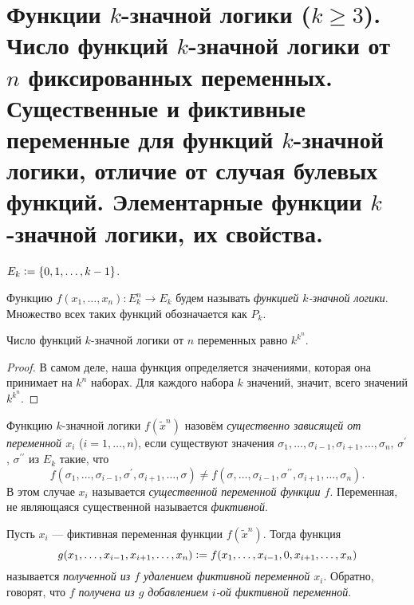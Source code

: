 \section{Функции $k$-значной логики ($k \geqslant 3$). Число функций $k$-значной логики от $n$ фиксированных переменных. Существенные и фиктивные переменные для функций $k$-значной логики, отличие от случая булевых функций. Элементарные функции $k$-значной логики, их свойства.}

\begin{definition}
    $E_k \vcentcolon = \{0, 1, \ldots, k - 1\}$.
\end{definition}

\begin{definition}
    Функцию $f(x_1, \ldots, x_n): \displaystyle E_k^n \to E_k$ будем называть \textit{функцией $k$-значной логики}. Множество всех таких функций обозначается как $P_k$.
\end{definition}

\begin{theorem}
    Число функций $k$-значной логики от $n$ переменных равно $k^{k^n}$.
\end{theorem}

\begin{proof}
    В самом деле, наша функция определяется значениями, которая она принимает на $k^n$ наборах. Для каждого набора $k$ значений, значит, всего значений $k^{k^n}$.
\end{proof}

\begin{definition}
    Функцию $k$-значной логики $f(\widetilde{x}^n)$ назовём \textit{существенно зависящей от переменной $x_i$} ($i = 1, \ldots, n$), если существуют значения $\sigma_1, \ldots, \sigma_{i - 1}, \sigma_{i + 1}, \ldots, \sigma_n$, $\sigma^\prime$, $\sigma^{\prime\prime}$ из $E_k$ такие, что \[f(\sigma_1, \ldots, \sigma_{i - 1}, \sigma^\prime, \sigma_{i + 1}, \ldots, \sigma) \ne f(\sigma, \ldots, \sigma_{i - 1}, \sigma^{\prime\prime}, \sigma_{i + 1}, \ldots, \sigma_n).\]
    В этом случае $x_i$ называется \textit{существенной переменной функции $f$}. Переменная, не являющаяся существенной называется \textit{фиктивной}.
\end{definition}

\begin{definition}
    Пусть $x_i$ --- фиктивная переменная функции $f(\widetilde{x}^n)$. Тогда функция \[g(x_1, \ldots, x_{i - 1}, x_{i + 1}, \ldots, x_n) \vcentcolon = f(x_1, \ldots, x_{i - 1}, 0, x_{i + 1}, \ldots, x_n)\]
    называется \textit{полученной из $f$ удалением фиктивной переменной $x_i$}. Обратно, говорят, что \textit{$f$ получена из $g$ добавлением $i$-ой фиктивной переменной}.
\end{definition}

